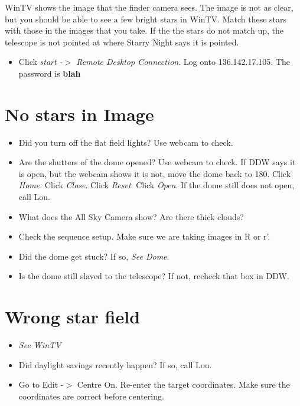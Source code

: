 \documentclass[11pt]{report}
\begin{document}
WinTV shows the image that the finder camera sees. The image is not as clear, but you should be able to see a few bright stars in WinTV. Match these stars with those in the images that you take. If the the stars do not match up, the telescope is not pointed at where Starry Night says it is pointed.
\begin{itemize}
\item Click \emph{start -{$>$} Remote Desktop Connection}. Log onto 136.142.17.105. The password is {\bf blah}
\end{itemize}

\section{No stars in Image}

\begin{itemize}
\item Did you turn off the flat field lights? Use webcam to check.
\item Are the shutters of the dome opened? Use webcam to check. If DDW says it is open, but the webcam shows it is not, move the dome back to 180. Click \emph{Home}. Click \emph{Close}. Click \emph{Reset}. Click \emph{Open}. If the dome still does not open, call Lou.
\item What does the All Sky Camera show? Are there thick clouds?
\item Check the sequence setup. Make sure we are taking images in R or r'.
\item Did the dome get stuck? If so, \emph{See Dome}.
\item Is the dome still slaved to the telescope? If not, recheck that box in DDW.
\end{itemize}

\section{Wrong star field}

\begin{itemize}
\item \emph{See WinTV}
\item Did daylight savings recently happen? If so, call Lou.
\item Go to Edit -{$>$} Centre On. Re-enter the target coordinates. Make sure the coordinates are correct before centering.
\end{itemize}
\end{document}

